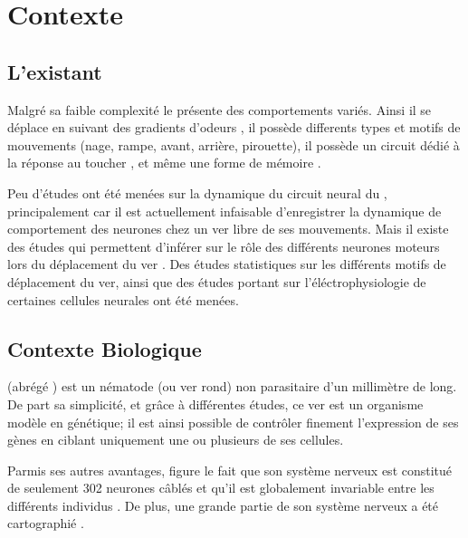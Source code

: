 \chapter{Contexte} %
\label{cha:Contexte}

\section{L'existant} %
\label{sec:L'existant}

Malgré sa faible complexité le \celeg{} présente des comportements variés.
Ainsi il se déplace en suivant des gradients d'odeurs
\cite{Ferree1999,Gray2005}, il possède differents types et motifs de mouvements
(nage, rampe, avant, arrière, pirouette), il possède un circuit dédié à la
réponse au toucher \cite{Chalfie1985}, et même une forme de mémoire
\cite{Rankin2005a}.

Peu d'études ont été menées sur la dynamique du circuit neural du \celeg{},
principalement car il est actuellement infaisable d'enregistrer la dynamique de
comportement des neurones chez un ver libre de ses mouvements.  Mais il existe
des études qui permettent d'inférer sur le rôle des différents neurones moteurs
lors du déplacement du ver \cite{Yanik2006,Chronis2007,Leifer2011}.  Des études
statistiques sur les différents motifs de déplacement \cite{Gray2005} du ver,
ainsi que des études portant sur l'éléctrophysiologie de certaines cellules
neurales \cite{Mellem2008a,Lockery2009} ont été menées.


\section{Contexte Biologique} %
\label{sec:Contexte Biologique}

\caeleg{} (abrégé \celeg{}) est un nématode (ou ver rond) non parasitaire d'un
millimètre de long. De part sa simplicité, et grâce à différentes études, ce
ver est un organisme modèle en génétique; il est ainsi possible de contrôler
finement l'expression de ses gènes en ciblant uniquement une ou plusieurs de
ses cellules.

Parmis ses autres avantages, figure le fait que son système nerveux est
constitué de seulement 302 neurones câblés et qu'il est globalement invariable
entre les différents individus \cite{Boyle2009}.  De plus, une grande partie de
son système nerveux a été cartographié
\cite{Durbin1987,Gray2005,Boyle2009,Varshney2011}.

